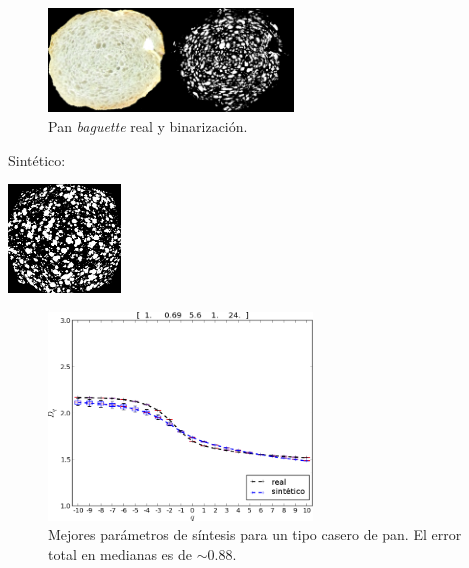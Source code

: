 \documentclass[spanish,unknownkeysallowed]{beamer}
\begin{document}
\begin{frame}
\begin{figure}
\begin{center}
\includegraphics[width=6.5cm]{../figures/realbin}
\caption{ Pan {\em baguette} real y binarización.}
\label{realbin}
\end{center}
\end{figure}
Sintético:
\begin{center}
\includegraphics[width=3cm]{../figures/best}
\end{center}
\end{frame}


\begin{frame}
\begin{figure}
\includegraphics[width=7cm]{../figures/bestboxplot2}
\caption[Mejores parámetros de síntesis para un tipo casero de pan]{Mejores parámetros de síntesis para un tipo casero de pan. El error total en medianas es de $\sim 0.88$.}
\label{bestboxplot2}
\end{figure}

\end{frame}
\end{document}
